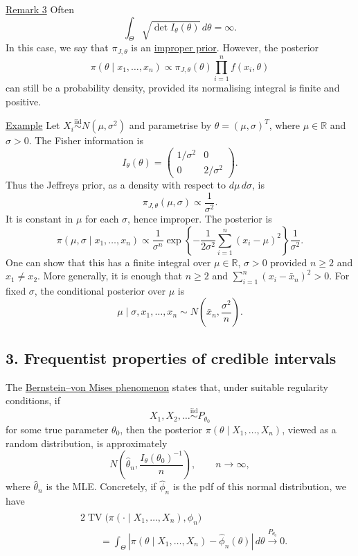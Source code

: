 \documentclass[11pt,a4paper]{article}
\begin{document}
\medskip
\noindent\underline{Remark 3}\quad
Often
\[
\int_\Theta\sqrt{\det I_\theta(\theta)}\,d\theta=\infty.
\]
In this case, we say that $\pi_{J,\theta}$ is an \underline{improper prior}.
However, the posterior
\[
\pi(\theta\mid x_1,\ldots,x_n)
\propto\pi_{J,\theta}(\theta)\prod_{i=1}^n f(x_i,\theta)
\]
can still be a probability density, provided its normalising integral is
finite and positive.

\medskip
\noindent\underline{Example}\quad
Let $X_i\overset{\mathrm{iid}}{\sim}N(\mu,\sigma^2)$ and parametrise by
$\theta=(\mu,\sigma)^T$, where $\mu\in\mathbb R$ and $\sigma>0$.
The Fisher information is
\[
I_\theta(\theta)=
\begin{pmatrix}
1/\sigma^2&0\\
0&2/\sigma^2
\end{pmatrix}.
\]
Thus the Jeffreys prior, as a density with respect to $d\mu\,d\sigma$, is
\[
\pi_{J,\theta}(\mu,\sigma)\propto\frac1{\sigma^2}.
\]
It is constant in $\mu$ for each $\sigma$, hence improper. The posterior is
\[
\pi(\mu,\sigma\mid x_1,\ldots,x_n)
\propto\frac1{\sigma^n}
\exp\left\{-\frac1{2\sigma^2}\sum_{i=1}^n(x_i-\mu)^2\right\}
\frac1{\sigma^2}.
\]
One can show that this has a finite integral over $\mu\in\mathbb R$,
$\sigma>0$ provided $n\geq2$ and $x_1\neq x_2$.
More generally, it is enough that $n\geq2$ and
$\sum_{i=1}^n(x_i-\bar x_n)^2>0$.
For fixed $\sigma$, the conditional posterior over $\mu$ is
\[
\mu\mid\sigma,x_1,\ldots,x_n
\sim N\left(\bar x_n,\frac{\sigma^2}{n}\right).
\]

\subsection*{3. Frequentist properties of credible intervals}

The \underline{Bernstein--von Mises phenomenon} states that, under suitable
regularity conditions, if
\[
X_1,X_2,\ldots\overset{\mathrm{iid}}{\sim}P_{\theta_0}
\]
for some true parameter $\theta_0$, then the posterior $\pi(\theta\mid X_1,\ldots,X_n)$,
viewed as a random distribution, is approximately
\[
N\left(\hat\theta_n,\frac{I_\theta(\theta_0)^{-1}}n\right),
\qquad n\to\infty,
\]
where $\hat\theta_n$ is the MLE.
Concretely, if $\hat\phi_n$ is the pdf of this normal distribution, we have
\[
\begin{aligned}
&2\operatorname{TV}\bigl(\pi(\cdot\mid X_1,\ldots,X_n),\hat\phi_n\bigr)\\
&\qquad=\int_\Theta
\left|\pi(\theta\mid X_1,\ldots,X_n)-\hat\phi_n(\theta)\right|\,d\theta
\xrightarrow{P_{\theta_0}}0.
\end{aligned}
\tag{$*$}
\]
\end{document}
